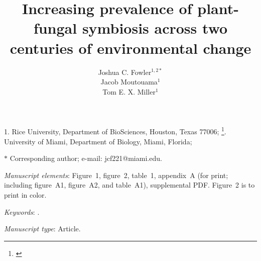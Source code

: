 \documentclass[11pt]{article}
\title{Increasing prevalence of plant-fungal symbiosis across two centuries of environmental change}
\author{Joshua C. Fowler$^{1,2\ast}$ \\
	Jacob Moutouama$^{1}$\\
	Tom E. X. Miller$^{1}$}
\date{}
\newcommand{\jacob}[2]{{\color{blue}{#1}}\footnote{\textit{\color{blue}{#2}}}}
\begin{document}
	
	\maketitle
	
	\noindent{} 1. Rice University, Department of BioSciences, Houston, Texas 77006;
	\noindent{} \jacob{1}{I think this is should be 2}. University of Miami, Department of Biology, Miami, Florida;


	\noindent{} $\ast$ Corresponding author; e-mail: jcf221@miami.edu.
	
	\bigskip
	
	\textit{Manuscript elements}: Figure~1, figure~2, table~1, appendix~A (for print; including figure~A1, figure~A2, and table~A1), supplemental PDF. Figure~2 is to print in color.
	
	\bigskip
	
	\textit{Keywords}: .
	
	\bigskip
	
	\textit{Manuscript type}: Article. %
	
	\bigskip
	
	
	
	\newpage{}
	
\end{document}
